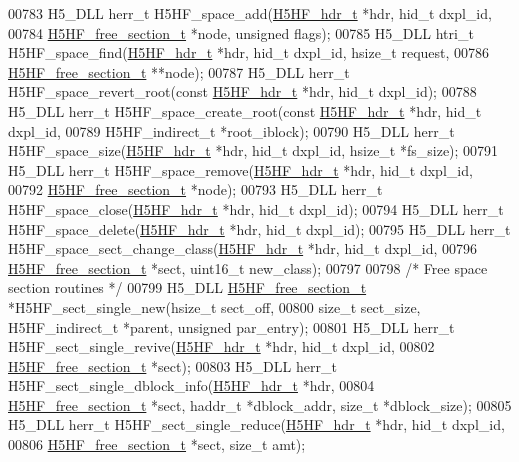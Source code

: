 \begin{DoxyCode}
00783 H5\_DLL herr\_t H5HF\_space\_add(\hyperlink{struct_h5_h_f__hdr__t}{H5HF\_hdr\_t} *hdr, hid\_t dxpl\_id,
00784     \hyperlink{struct_h5_h_f__free__section__t}{H5HF\_free\_section\_t} *node, \textcolor{keywordtype}{unsigned} flags);
00785 H5\_DLL htri\_t H5HF\_space\_find(\hyperlink{struct_h5_h_f__hdr__t}{H5HF\_hdr\_t} *hdr, hid\_t dxpl\_id, hsize\_t request,
00786     \hyperlink{struct_h5_h_f__free__section__t}{H5HF\_free\_section\_t} **node);
00787 H5\_DLL herr\_t H5HF\_space\_revert\_root(\textcolor{keyword}{const} \hyperlink{struct_h5_h_f__hdr__t}{H5HF\_hdr\_t} *hdr, hid\_t dxpl\_id);
00788 H5\_DLL herr\_t H5HF\_space\_create\_root(\textcolor{keyword}{const} \hyperlink{struct_h5_h_f__hdr__t}{H5HF\_hdr\_t} *hdr, hid\_t dxpl\_id,
00789     H5HF\_indirect\_t *root\_iblock);
00790 H5\_DLL herr\_t H5HF\_space\_size(\hyperlink{struct_h5_h_f__hdr__t}{H5HF\_hdr\_t} *hdr, hid\_t dxpl\_id, hsize\_t *fs\_size);
00791 H5\_DLL herr\_t H5HF\_space\_remove(\hyperlink{struct_h5_h_f__hdr__t}{H5HF\_hdr\_t} *hdr, hid\_t dxpl\_id,
00792     \hyperlink{struct_h5_h_f__free__section__t}{H5HF\_free\_section\_t} *node);
00793 H5\_DLL herr\_t H5HF\_space\_close(\hyperlink{struct_h5_h_f__hdr__t}{H5HF\_hdr\_t} *hdr, hid\_t dxpl\_id);
00794 H5\_DLL herr\_t H5HF\_space\_delete(\hyperlink{struct_h5_h_f__hdr__t}{H5HF\_hdr\_t} *hdr, hid\_t dxpl\_id);
00795 H5\_DLL herr\_t H5HF\_space\_sect\_change\_class(\hyperlink{struct_h5_h_f__hdr__t}{H5HF\_hdr\_t} *hdr, hid\_t dxpl\_id,
00796     \hyperlink{struct_h5_h_f__free__section__t}{H5HF\_free\_section\_t} *sect, uint16\_t new\_class);
00797 
00798 \textcolor{comment}{/* Free space section routines */}
00799 H5\_DLL \hyperlink{struct_h5_h_f__free__section__t}{H5HF\_free\_section\_t} *H5HF\_sect\_single\_new(hsize\_t sect\_off,
00800     \textcolor{keywordtype}{size\_t} sect\_size, H5HF\_indirect\_t *parent, \textcolor{keywordtype}{unsigned} par\_entry);
00801 H5\_DLL herr\_t H5HF\_sect\_single\_revive(\hyperlink{struct_h5_h_f__hdr__t}{H5HF\_hdr\_t} *hdr, hid\_t dxpl\_id,
00802     \hyperlink{struct_h5_h_f__free__section__t}{H5HF\_free\_section\_t} *sect);
00803 H5\_DLL herr\_t H5HF\_sect\_single\_dblock\_info(\hyperlink{struct_h5_h_f__hdr__t}{H5HF\_hdr\_t} *hdr,
00804     \hyperlink{struct_h5_h_f__free__section__t}{H5HF\_free\_section\_t} *sect, haddr\_t *dblock\_addr, \textcolor{keywordtype}{size\_t} *dblock\_size);
00805 H5\_DLL herr\_t H5HF\_sect\_single\_reduce(\hyperlink{struct_h5_h_f__hdr__t}{H5HF\_hdr\_t} *hdr, hid\_t dxpl\_id,
00806     \hyperlink{struct_h5_h_f__free__section__t}{H5HF\_free\_section\_t} *sect, \textcolor{keywordtype}{size\_t} amt);

\end{DoxyCode}
